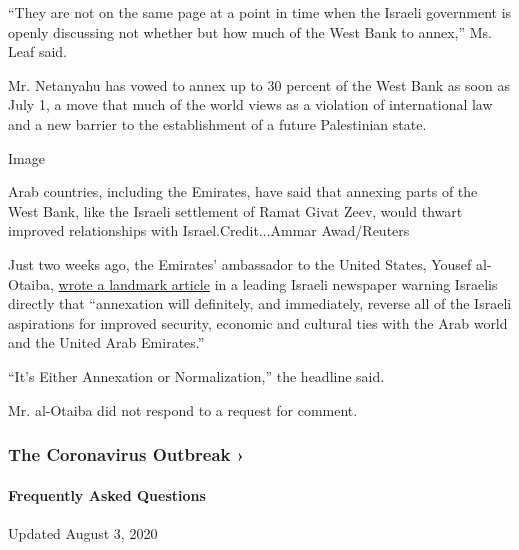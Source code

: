 ``They are not on the same page at a point in time when the Israeli
government is openly discussing not whether but how much of the West
Bank to annex,'' Ms. Leaf said.

Mr. Netanyahu has vowed to annex up to 30 percent of the West Bank as
soon as July 1, a move that much of the world views as a violation of
international law and a new barrier to the establishment of a future
Palestinian state.

Image

Arab countries, including the Emirates, have said that annexing parts of
the West Bank, like the Israeli settlement of Ramat Givat Zeev, would
thwart improved relationships with Israel.Credit...Ammar Awad/Reuters

Just two weeks ago, the Emirates' ambassador to the United States,
Yousef al-Otaiba,
\href{https://www.nytimes.com/2020/06/12/world/middleeast/west-bank-annexation-israel-uae.html}{wrote
a landmark article} in a leading Israeli newspaper warning Israelis
directly that ``annexation will definitely, and immediately, reverse all
of the Israeli aspirations for improved security, economic and cultural
ties with the Arab world and the United Arab Emirates.''

``It's Either Annexation or Normalization,'' the headline said.

Mr. al-Otaiba did not respond to a request for comment.

\href{https://www.nytimes.com/news-event/coronavirus?action=click\&pgtype=Article\&state=default\&region=MAIN_CONTENT_3\&context=storylines_faq}{}

\hypertarget{the-coronavirus-outbreak-}{%
\subsubsection{The Coronavirus Outbreak
›}\label{the-coronavirus-outbreak-}}

\hypertarget{frequently-asked-questions}{%
\paragraph{Frequently Asked
Questions}\label{frequently-asked-questions}}

Updated August 3, 2020

